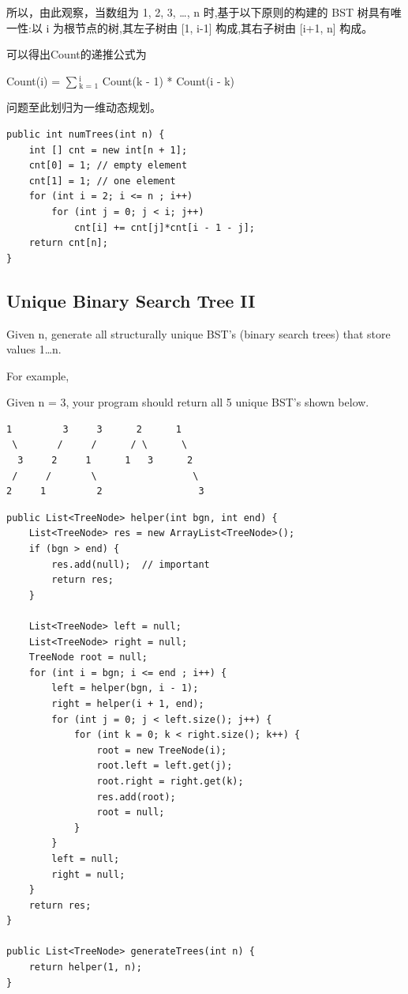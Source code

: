 \documentclass[12pt]{book}
\begin{document}
所以，由此观察，当数组为 1, 2, 3, \ldots{}, n 时,基于以下原则的构建的 BST 树具有唯一性:以 i 为根节点的树,其左子树由 [1, i-1] 构成,其右子树由 [i+1, n] 构成。

可以得出Count的递推公式为

Count(i) = $\sum$$_{\text{k = 1}}^{\text{i}}$ Count(k - 1) * Count(i - k) 

问题至此划归为一维动态规划。
\lstset{language=java,label= ,caption= ,numbers=none}
\begin{lstlisting}
public int numTrees(int n) {
    int [] cnt = new int[n + 1];
    cnt[0] = 1; // empty element
    cnt[1] = 1; // one element
    for (int i = 2; i <= n ; i++) 
        for (int j = 0; j < i; j++) 
            cnt[i] += cnt[j]*cnt[i - 1 - j];
    return cnt[n];
}
\end{lstlisting}
\subsection{Unique Binary Search Tree II}
\label{sec-14-2-5}
Given n, generate all structurally unique BST's (binary search trees) that store values 1\ldots{}n.

For example,

Given n = 3, your program should return all 5 unique BST's shown below.
\lstset{language=java,label= ,caption= ,numbers=none}
\begin{lstlisting}
1         3     3      2      1
 \       /     /      / \      \
  3     2     1      1   3      2
 /     /       \                 \
2     1         2                 3
\end{lstlisting}
\lstset{language=java,label= ,caption= ,numbers=none}
\begin{lstlisting}
public List<TreeNode> helper(int bgn, int end) {
    List<TreeNode> res = new ArrayList<TreeNode>();
    if (bgn > end) {
        res.add(null);  // important
        return res;
    }

    List<TreeNode> left = null;
    List<TreeNode> right = null;
    TreeNode root = null;
    for (int i = bgn; i <= end ; i++) {
        left = helper(bgn, i - 1);
        right = helper(i + 1, end);
        for (int j = 0; j < left.size(); j++) {
            for (int k = 0; k < right.size(); k++) {
                root = new TreeNode(i);
                root.left = left.get(j);
                root.right = right.get(k);
                res.add(root);
                root = null;
            }
        }
        left = null;
        right = null;
    }
    return res;
}

public List<TreeNode> generateTrees(int n) {
    return helper(1, n);
}
\end{lstlisting}
\end{document}
